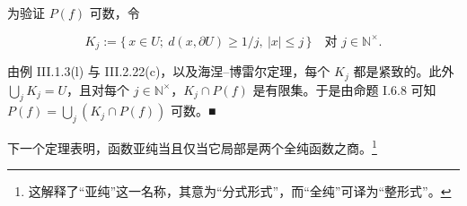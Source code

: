 \begin{remark}
\begin{subitems}
为验证 $ P(f) $ 可数，令

\[
K_{j} := \{\, x \in U ;\ d(x,\partial U) \ge 1/j,\ |x| \le j \,\} \quad \text{对 } j \in \mathbb{N}^{\times} .
\]

由例 III.1.3(l) 与 III.2.22(c)，以及海涅–博雷尔定理，每个 $ K_{j} $ 都是紧致的。此外 $ \bigcup_{j}K_{j} = U $，且对每个 $ j \in \mathbb{N}^{\times} $，$ K_{j}\cap P(f) $ 是有限集。于是由命题 I.6.8 可知 $ P(f) = \bigcup_{j}\left(K_{j}\cap P(f)\right) $ 可数。\nobreak\hspace{0.35em}■

\end{subitems}

下一个定理表明，函数亚纯当且仅当它局部是两个全纯函数之商。\footnote{这解释了“亚纯”这一名称，其意为“分式形式”，而“全纯”可译为“整形式”。}

\end{remark}

